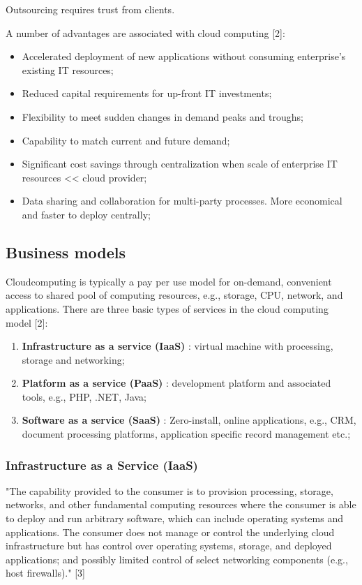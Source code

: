 Outsourcing requires trust from clients.


A number of advantages are associated with cloud computing [2]:
\begin{itemize}
	\item Accelerated deployment of new applications without consuming enterprise's existing IT resources;
	\item Reduced capital requirements for up-front IT investments;
	\item Flexibility to meet sudden changes in demand peaks and troughs;
	\item Capability to match current and future demand;
	\item Significant cost savings through centralization when scale of enterprise IT resources << cloud provider;
	\item Data sharing and collaboration for multi-party processes. More economical and faster to deploy centrally;
\end{itemize}






\subsection{Business models}

Cloudcomputing is typically a pay per use model for on-demand, convenient access to shared pool of computing resources, e.g., storage, CPU, network, and applications. There are three basic types of services in the cloud computing model [2]:
\begin{enumerate}
	\item \textbf{Infrastructure as a service (IaaS)} : virtual machine with processing, storage and networking;
	\item \textbf{Platform as a service (PaaS)} : development platform and associated tools, e.g., PHP, .NET, Java;
	\item \textbf{Software as a service (SaaS)} : Zero-install, online applications, e.g., CRM, document processing platforms, application specific record management etc.;
\end{enumerate}


\subsubsection{Infrastructure as a Service (IaaS)}

"The capability provided to the consumer is to provision processing, storage, networks, and other fundamental computing resources where the consumer is able to deploy and run arbitrary software, which can include operating systems and applications. The consumer does not manage or control the underlying cloud infrastructure but has control over operating systems, storage, and deployed applications; and possibly limited control of select networking components (e.g., host firewalls)." [3]


